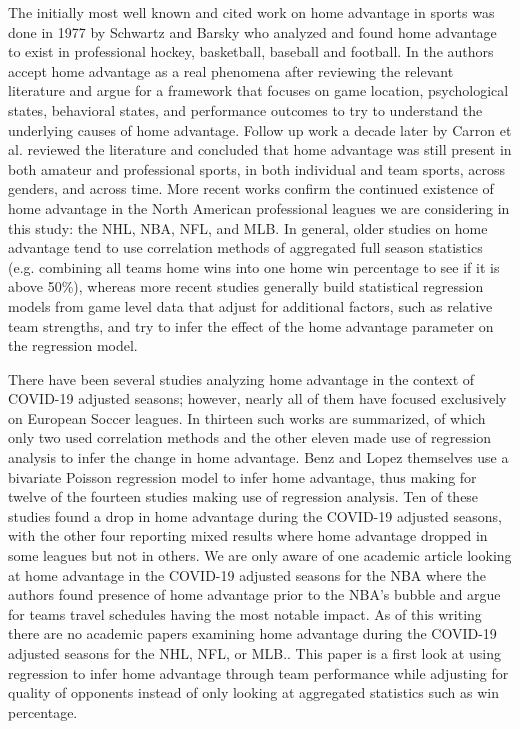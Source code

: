 The initially most well known and cited work on home advantage in sports was done in 1977 by Schwartz and Barsky \cite{Schwartz1977} who analyzed and found home advantage to exist in professional hockey, basketball, baseball and football. In \cite{Courneya1992} the authors accept home advantage as a real phenomena after reviewing the relevant literature and argue for a framework that focuses on game location, psychological states, behavioral states, and performance outcomes to try to understand the underlying causes of home advantage. Follow up work a decade later by Carron et al. \cite{Carron2005} reviewed the literature and concluded that home advantage was still present in both amateur and professional sports, in both individual and team sports, across genders, and across time. More recent works \cite{Pollard2005a} \cite{Gomez2011} confirm the continued existence of home advantage in the North American professional leagues we are considering in this study: the NHL, NBA, NFL, and MLB. In general, older studies on home advantage tend to use correlation methods of aggregated full season statistics (e.g. combining all teams home wins into one home win percentage to see if it is above 50\%), whereas more recent studies generally build statistical regression models from game level data that adjust for additional factors, such as relative team strengths, and try to infer the effect of the home advantage parameter on the regression model.

There have been several studies analyzing home advantage in the context of COVID-19 adjusted seasons; however, nearly all of them have focused exclusively on European Soccer leagues. In \cite{Benz2020} thirteen such works are summarized, of which only two used correlation methods and the other eleven made use of regression analysis to infer the change in home advantage. Benz and Lopez themselves use a bivariate Poisson regression model to infer home advantage, thus making for twelve of the fourteen studies making use of regression analysis. Ten of these studies found a drop in home advantage during the COVID-19 adjusted seasons, with the other four reporting mixed results where home advantage dropped in some leagues but not in others. We are only aware of one academic article looking at home advantage in the COVID-19 adjusted seasons for the NBA \cite{McHill2020} where the authors found presence of home advantage prior to the NBA's bubble and argue for teams travel schedules having the most notable impact. As of this writing there are no academic papers examining home advantage during the COVID-19 adjusted seasons for the NHL, NFL, or MLB.. This paper is a first look at using regression to infer home advantage through team performance while adjusting for quality of opponents instead of only looking at aggregated statistics such as win percentage.

